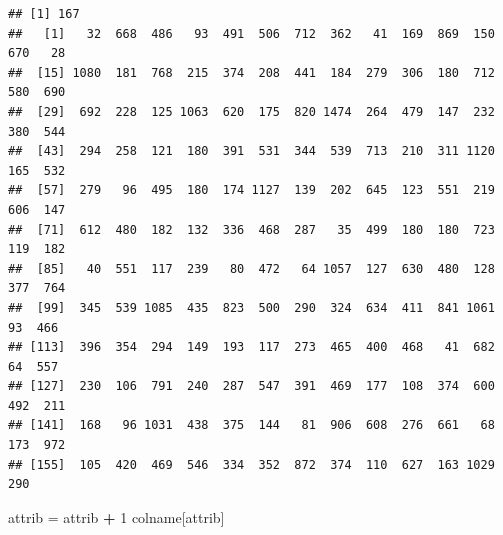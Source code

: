 \documentclass[]{article}
\newenvironment{Shaded}{\begin{snugshade}}{\end{snugshade}}
\newcommand{\KeywordTok}[1]{\textcolor[rgb]{0.13,0.29,0.53}{\textbf{#1}}}
\newcommand{\DataTypeTok}[1]{\textcolor[rgb]{0.13,0.29,0.53}{#1}}
\newcommand{\DecValTok}[1]{\textcolor[rgb]{0.00,0.00,0.81}{#1}}
\newcommand{\StringTok}[1]{\textcolor[rgb]{0.31,0.60,0.02}{#1}}
\newcommand{\CommentTok}[1]{\textcolor[rgb]{0.56,0.35,0.01}{\textit{#1}}}
\newcommand{\ControlFlowTok}[1]{\textcolor[rgb]{0.13,0.29,0.53}{\textbf{#1}}}
\newcommand{\OperatorTok}[1]{\textcolor[rgb]{0.81,0.36,0.00}{\textbf{#1}}}
\newcommand{\NormalTok}[1]{#1}
\begin{document}
\begin{verbatim}
## [1] 167
##   [1]   32  668  486   93  491  506  712  362   41  169  869  150  670   28
##  [15] 1080  181  768  215  374  208  441  184  279  306  180  712  580  690
##  [29]  692  228  125 1063  620  175  820 1474  264  479  147  232  380  544
##  [43]  294  258  121  180  391  531  344  539  713  210  311 1120  165  532
##  [57]  279   96  495  180  174 1127  139  202  645  123  551  219  606  147
##  [71]  612  480  182  132  336  468  287   35  499  180  180  723  119  182
##  [85]   40  551  117  239   80  472   64 1057  127  630  480  128  377  764
##  [99]  345  539 1085  435  823  500  290  324  634  411  841 1061   93  466
## [113]  396  354  294  149  193  117  273  465  400  468   41  682   64  557
## [127]  230  106  791  240  287  547  391  469  177  108  374  600  492  211
## [141]  168   96 1031  438  375  144   81  906  608  276  661   68  173  972
## [155]  105  420  469  546  334  352  872  374  110  627  163 1029  290
\end{verbatim}

\begin{Shaded}
\end{Shaded}

\begin{Shaded}
\begin{Highlighting}[]
\NormalTok{attrib =}\StringTok{ }\NormalTok{attrib }\OperatorTok{+}\StringTok{ }\DecValTok{1}
\NormalTok{colname[attrib]}
\end{Highlighting}
\end{Shaded}
\end{document}
